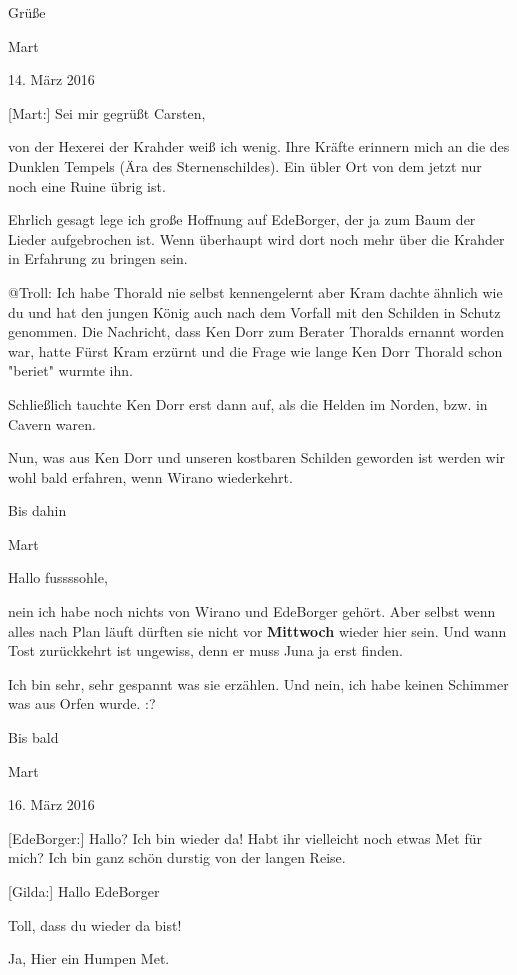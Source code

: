 \documentclass[10pt, a4paper, oneside]{book}
\begin{document}
\begin{multicols}{2}
Grüße

Mart

\begin{center}
    14. März 2016
\end{center}

[Mart:] Sei mir gegrüßt Carsten,

von der Hexerei der Krahder weiß ich wenig. Ihre Kräfte erinnern mich an die des Dunklen Tempels (Ära des Sternenschildes). Ein übler Ort von dem jetzt nur noch eine Ruine übrig ist.

Ehrlich gesagt lege ich große Hoffnung auf EdeBorger, der ja zum Baum der Lieder aufgebrochen ist. Wenn überhaupt wird dort noch mehr über die Krahder in Erfahrung zu bringen sein.

@Troll: Ich habe Thorald nie selbst kennengelernt aber Kram dachte ähnlich wie du und hat den jungen König auch nach dem Vorfall mit den Schilden in Schutz genommen. Die Nachricht, dass Ken Dorr zum Berater Thoralds ernannt worden war, hatte Fürst Kram erzürnt und die Frage wie lange Ken Dorr Thorald schon "beriet" wurmte ihn.

Schließlich tauchte Ken Dorr erst dann auf, als die Helden im Norden, bzw. in Cavern waren.

Nun, was aus Ken Dorr und unseren kostbaren Schilden geworden ist werden wir wohl bald erfahren, wenn Wirano wiederkehrt.


Bis dahin

Mart


Hallo fussssohle,

nein ich habe noch nichts von Wirano und EdeBorger gehört. Aber selbst wenn alles nach Plan läuft dürften sie nicht vor \textbf{Mittwoch} wieder hier sein. Und wann Tost zurückkehrt ist ungewiss, denn er muss Juna ja erst finden.

Ich bin sehr, sehr gespannt was sie erzählen. Und nein, ich habe keinen Schimmer was aus Orfen wurde. :?

Bis bald

Mart

\begin{center}
    16. März 2016
\end{center}

[EdeBorger:] Hallo? Ich bin wieder da! Habt ihr vielleicht noch etwas Met für mich? Ich bin ganz schön durstig von der langen Reise.

[Gilda:] Hallo EdeBorger

Toll, dass du wieder da bist!

Ja, Hier ein Humpen Met.


\end{multicols}
\end{document}
